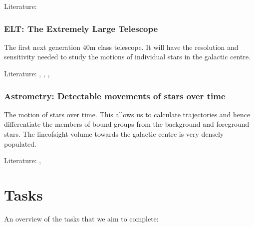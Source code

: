 \documentclass[letterpaper,10pt,english]{sphinxmanual}
\begin{document}
\sphinxAtStartPar
Literature:


\subsection{ELT: The Extremely Large Telescope}
\label{\detokenize{Project_Overview/Aims:elt-the-extremely-large-telescope}}
\sphinxAtStartPar
The first next generation 40m class telescope.
It will have the resolution and sensitivity needed to study the motions of
individual stars in the galactic centre.

\sphinxAtStartPar
Literature:
,
,
,


\subsection{Astrometry: Detectable movements of stars over time}
\label{\detokenize{Project_Overview/Aims:astrometry-detectable-movements-of-stars-over-time}}
\sphinxAtStartPar
The motion of stars over time. This allows us to calculate trajectories and
hence differentiate the members of bound groups from the background and
foreground stars.
The line\sphinxhyphen{}of\sphinxhyphen{}sight volume towards the galactic centre is very densely populated.

\sphinxAtStartPar
Literature:
,


\chapter{Tasks}
\label{\detokenize{Project_Overview/Tasks:tasks}}\label{\detokenize{Project_Overview/Tasks::doc}}
\sphinxAtStartPar
An overview of the tasks that we aim to complete:
\end{document}

